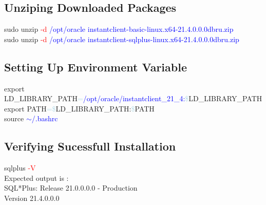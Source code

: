 \subsection{Unziping Downloaded Packages}
\begin{tcolorbox}
    \textcolor{Sudo}{sudo} \textcolor{greenCommand}{unzip} \textcolor{red}{-d} \textcolor{blue}{/opt/oracle} \textcolor{blue}{instantclient-basic-linux.x64-21.4.0.0.0dbru.zip}\\
        \textcolor{Sudo}{sudo} \textcolor{greenCommand}{unzip} \textcolor{red}{-d} \textcolor{blue}{/opt/oracle}  \textcolor{blue}{instantclient-sqlplus-linux.x64-21.4.0.0.0dbru.zip}
\end{tcolorbox}
\subsection{Setting Up Environment Variable}
\begin{tcolorbox}
    \textcolor{Sudo}{export} LD\_LIBRARY\_PATH\textcolor{lightBlue}{=}\textcolor{blue}{/opt/oracle/instantclient\_21\_4:}\textcolor{lightBlue}{\$}LD\_LIBRARY\_PATH \\
    \textcolor{Sudo}{export} PATH\textcolor{lightBlue}{=}\textcolor{lightBlue}{\$}LD\_LIBRARY\_PATH:\textcolor{lightBlue}{\$}PATH\\
    \textcolor{Sudo}{source} \textcolor{blue}{$\sim$/.bashrc}

\end{tcolorbox}

\subsection{Verifying Sucessfull Installation}
\begin{tcolorbox} 
    \textcolor{greenCommand}{sqlplus} \textcolor{red}{-V}\\
     
    Expected output is : \\
    
    SQL*Plus: Release 21.0.0.0.0 - Production\\
    Version 21.4.0.0.0
     
\end{tcolorbox}
